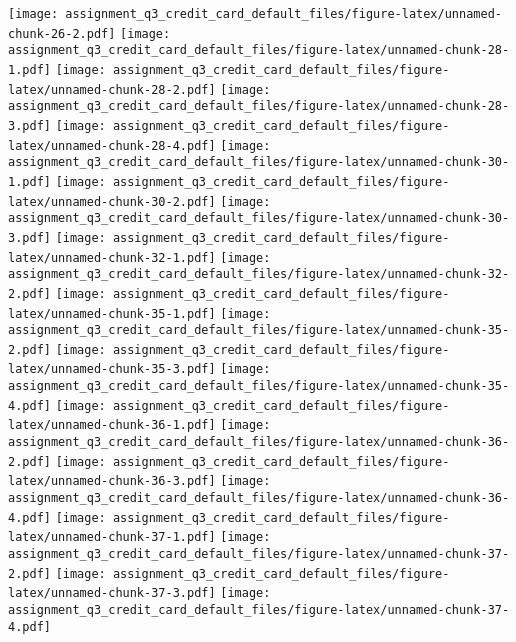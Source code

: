 \texttt{[image: assignment\_q3\_credit\_card\_default\_files/figure-latex/unnamed-chunk-26-2.pdf]}
\texttt{[image: assignment\_q3\_credit\_card\_default\_files/figure-latex/unnamed-chunk-28-1.pdf]}
\texttt{[image: assignment\_q3\_credit\_card\_default\_files/figure-latex/unnamed-chunk-28-2.pdf]}
\texttt{[image: assignment\_q3\_credit\_card\_default\_files/figure-latex/unnamed-chunk-28-3.pdf]}
\texttt{[image: assignment\_q3\_credit\_card\_default\_files/figure-latex/unnamed-chunk-28-4.pdf]}
\texttt{[image: assignment\_q3\_credit\_card\_default\_files/figure-latex/unnamed-chunk-30-1.pdf]}
\texttt{[image: assignment\_q3\_credit\_card\_default\_files/figure-latex/unnamed-chunk-30-2.pdf]}
\texttt{[image: assignment\_q3\_credit\_card\_default\_files/figure-latex/unnamed-chunk-30-3.pdf]}
\texttt{[image: assignment\_q3\_credit\_card\_default\_files/figure-latex/unnamed-chunk-32-1.pdf]}
\texttt{[image: assignment\_q3\_credit\_card\_default\_files/figure-latex/unnamed-chunk-32-2.pdf]}
\texttt{[image: assignment\_q3\_credit\_card\_default\_files/figure-latex/unnamed-chunk-35-1.pdf]}
\texttt{[image: assignment\_q3\_credit\_card\_default\_files/figure-latex/unnamed-chunk-35-2.pdf]}
\texttt{[image: assignment\_q3\_credit\_card\_default\_files/figure-latex/unnamed-chunk-35-3.pdf]}
\texttt{[image: assignment\_q3\_credit\_card\_default\_files/figure-latex/unnamed-chunk-35-4.pdf]}
\texttt{[image: assignment\_q3\_credit\_card\_default\_files/figure-latex/unnamed-chunk-36-1.pdf]}
\texttt{[image: assignment\_q3\_credit\_card\_default\_files/figure-latex/unnamed-chunk-36-2.pdf]}
\texttt{[image: assignment\_q3\_credit\_card\_default\_files/figure-latex/unnamed-chunk-36-3.pdf]}
\texttt{[image: assignment\_q3\_credit\_card\_default\_files/figure-latex/unnamed-chunk-36-4.pdf]}
\texttt{[image: assignment\_q3\_credit\_card\_default\_files/figure-latex/unnamed-chunk-37-1.pdf]}
\texttt{[image: assignment\_q3\_credit\_card\_default\_files/figure-latex/unnamed-chunk-37-2.pdf]}
\texttt{[image: assignment\_q3\_credit\_card\_default\_files/figure-latex/unnamed-chunk-37-3.pdf]}
\texttt{[image: assignment\_q3\_credit\_card\_default\_files/figure-latex/unnamed-chunk-37-4.pdf]}
